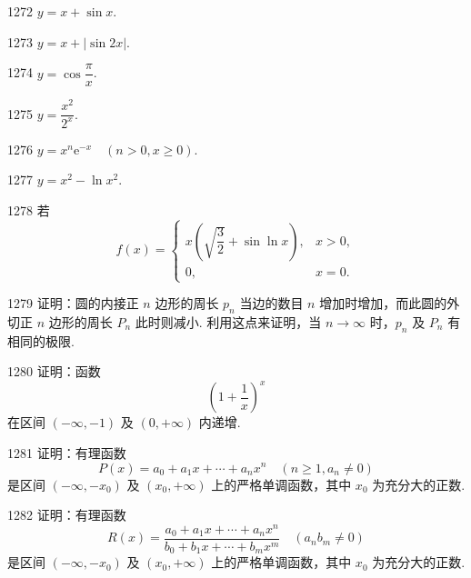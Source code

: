 \begin{prob}[S]{1272}
$y = x + \sin x$.
\end{prob}

\begin{prob}[S]{1273}
$y = x + |\sin 2x|$.
\end{prob}

\begin{prob}[S]{1274}
$y = \cos \dfrac{\pi}{x}$.
\end{prob}

\begin{prob}[S]{1275}
$y = \dfrac{x^2}{2^x}$.
\end{prob}

\begin{prob}[S]{1276}
$y = x^n \mathrm{e}^{-x} \quad (n > 0, x \geqslant 0)$.
\end{prob}

\begin{prob}[S]{1277}
$y = x^2 - \ln x^2$.
\end{prob}

\begin{prob}[M]{1278}
若
\[
f(x) = \begin{cases}
x\left(\sqrt{\dfrac{3}{2}} + \sin\ln x\right), & x > 0, \\
0, & x = 0.
\end{cases}
\]
\end{prob}

\begin{prob}[M]{1279}
证明：圆的内接正 $n$ 边形的周长 $p_n$ 当边的数目 $n$ 增加时增加，而此圆的外切正 $n$ 边形的周长 $P_n$ 此时则减小. 利用这点来证明，当 $n \to \infty$ 时，$p_n$ 及 $P_n$ 有相同的极限.
\end{prob}

\begin{prob}[M]{1280}
证明：函数
\[
\left(1 + \frac{1}{x}\right)^x
\]
在区间 $(-\infty, -1)$ 及 $(0, +\infty)$ 内递增.
\end{prob}

\begin{prob}[M]{1281}
证明：有理函数
\[
P(x) = a_0 + a_1 x + \cdots + a_n x^n \quad (n \geqslant 1, a_n \neq 0)
\]
是区间 $(-\infty, -x_0)$ 及 $(x_0, +\infty)$ 上的严格单调函数，其中 $x_0$ 为充分大的正数.
\end{prob}

\begin{prob}[M]{1282}
证明：有理函数
\[
R(x) = \frac{a_0 + a_1 x + \cdots + a_n x^n}{b_0 + b_1 x + \cdots + b_m x^m} \quad (a_n b_m \neq 0)
\]
是区间 $(-\infty, -x_0)$ 及 $(x_0, +\infty)$ 上的严格单调函数，其中 $x_0$ 为充分大的正数.
\end{prob}

